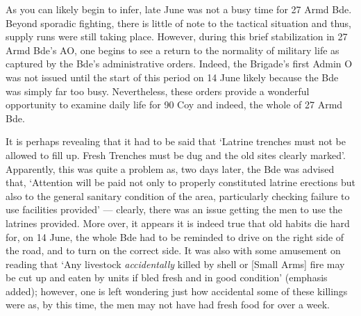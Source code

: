 \documentclass[noraggedright]{turabian-researchpaper}
\begin{document}



As you can likely begin to infer, late June was not a busy time for 27
Armd Bde.  Beyond sporadic fighting, there is little of note to the tactical
situation and thus, supply runs were still taking place. However, during this
brief stabilization in 27 Armd Bde's AO, one begins to see a return to the
normality of military life as captured by the Bde's administrative 
orders.\autocite[See end of June diaries]{27wd}
Indeed, the Brigade's first Admin O was not issued until the start of this
period on 14 June likely because the Bde was simply far too busy.  
Nevertheless, these orders provide a wonderful opportunity to examine daily
life for 90 Coy and indeed, the whole of 27 Armd Bde.  

It is perhaps revealing that it had to be said that `Latrine trenches must
not be allowed to fill up.  Fresh Trenches must be dug and the old sites
clearly marked'.\autocite[June Adm Order No. 3][Para 10]{27wd}  Apparently,
this was quite a problem as, two days later, the Bde was advised that, 
`Attention will be paid not only to properly constituted latrine erections but
also to the general sanitary condition of the area, particularly checking 
failure to use facilities provided' --- clearly, there was an issue getting 
the men to use the latrines provided.\autocite[June Adm Order No. 4, Para 1a]
{27wd}  
More over, it appears it is indeed true that old habits die hard for, on 
14 June, the whole Bde had to be reminded to drive on the right side of the
road, and to turn on the correct side.\autocite[June Adm Order No. 1][Para 9]
{27wd}  It was also with some amusement on reading that `Any livestock 
\textit{accidentally} killed by shell or [Small Arms] fire may be cut up 
and eaten by units if bled fresh and in good condition' (emphasis added);
however, one is left wondering just how accidental some of these killings
were as, by this time, the men may not have had fresh food for over a 
week.\autocite[June Adm Order No. 1][Para 10]{27wd}
\end{document}
